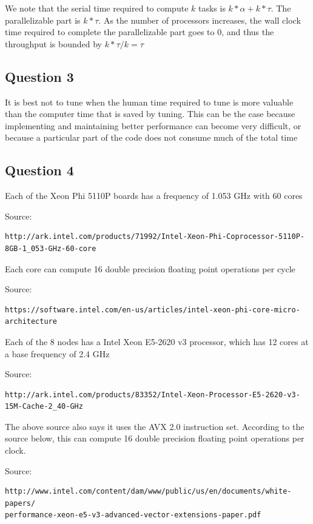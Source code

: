 \documentclass[11pt]{article}
\begin{document}
We note that the serial time required to compute $k$ tasks is $k*\alpha + k*\tau$. The parallelizable part is $k*\tau$. As the number of processors increases, the wall clock time required to complete the parallelizable part goes to 0, and thus the throughput is bounded by $k*\tau/k = \tau$
	
	
\subsection*{Question 3}

It is best not to tune when the human time required to tune is more valuable than the computer time that is saved by tuning.
This can be the case because implementing and maintaining better performance can become very difficult,
or because a particular part of the code does not consume much of the total time

\subsection*{Question 4}

Each of the Xeon Phi 5110P boards has a frequency of 1.053 GHz with 60 cores

Source: 
\begin{verbatim}
http://ark.intel.com/products/71992/Intel-Xeon-Phi-Coprocessor-5110P-8GB-1_053-GHz-60-core
\end{verbatim}
	
Each core can compute 16 double precision floating point operations per cycle

Source: 
\begin{verbatim}
https://software.intel.com/en-us/articles/intel-xeon-phi-core-micro-architecture
\end{verbatim}
	
Each of the 8 nodes has a Intel Xeon E5-2620 v3 processor, which has 12 cores at a base frequency of 2.4 GHz

Source: 
\begin{verbatim}
http://ark.intel.com/products/83352/Intel-Xeon-Processor-E5-2620-v3-15M-Cache-2_40-GHz
\end{verbatim}

The above source also says it uses the AVX 2.0 instruction set. According to the source below, this can compute 16 double precision floating point operations per clock.

Source: 
\begin{verbatim} 
http://www.intel.com/content/dam/www/public/us/en/documents/white-papers/
performance-xeon-e5-v3-advanced-vector-extensions-paper.pdf 
\end{verbatim}
\end{document}
